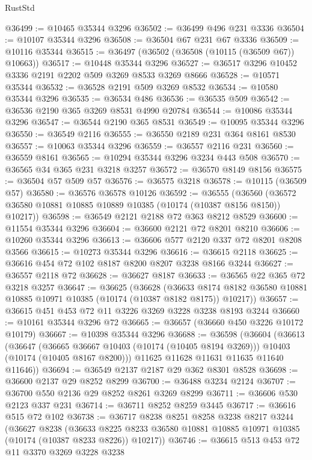 \begin{lexlean}{RustStd}
\begin{coremodule}
@36499 := @10465 @35344 @3296
@36502 := @36499 @496 @231 @3336
@36504 := @10107 @35344 @3296
@36508 := @36504 @67 @231 @67 @3336
@36509 := @10116 @35344
@36515 := @36497 (@36502 (@36508 (@10115 (@36509 @67)) @10663))
@36517 := @10448 @35344 @3296
@36527 := @36517 @3296 @10452 @3336 @2191 @2202 @509 @3269 @8533 @3269 @8666
@36528 := @10571 @35344
@36532 := @36528 @2191 @509 @3269 @8532
@36534 := @10580 @35344 @3296
@36535 := @36534 @486
@36536 := @36535 @509
@36542 := @36536 @2190 @365 @3269 @8531 @4990 @20784
@36544 := @10086 @35344 @3296
@36547 := @36544 @2190 @365 @8531
@36549 := @10095 @35344 @3296
@36550 := @36549 @2116
@36555 := @36550 @2189 @231 @364 @8161 @8530
@36557 := @10063 @35344 @3296
@36559 := @36557 @2116 @231
@36560 := @36559 @8161
@36565 := @10294 @35344 @3296 @3234 @443 @508
@36570 := @36565 @34 @365 @231 @3218 @3257
@36572 := @36570 @8149 @8156
@36575 := @36504 @57 @509 @57
@36576 := @36575 @3218
@36578 := @10115 (@36509 @57)
@36580 := @36576 @36578 @10126
@36592 := @36555
    (@36560 (@36572 @36580 @10881 @10885 @10889 @10385 (@10174 (@10387 @8156 @8150)) @10217))
@36598 := @36549 @2121 @2188 @72 @363 @8212 @8529
@36600 := @11554 @35344 @3296
@36604 := @36600 @2121 @72 @8201 @8210
@36606 := @10260 @35344 @3296
@36613 := @36606 @577 @2120 @337 @72 @8201 @8208 @3566
@36615 := @10273 @35344 @3296
@36616 := @36615 @2118
@36625 := @36616 @454 @72 @102 @8187 @8200 @8207 @3238 @8166 @3244
@36627 := @36557 @2118 @72
@36628 := @36627 @8187
@36633 := @36565 @22 @365 @72 @3218 @3257
@36647 := @36625
    (@36628
      (@36633 @8174 @8182 @36580 @10881 @10885 @10971 @10385 (@10174 (@10387 @8182 @8175)) @10217))
@36657 := @36615 @451 @453 @72 @11 @3226 @3269 @3228 @3238 @8193 @3244
@36660 := @10161 @35344 @3296 @72
@36665 := @36657 (@36660 @450 @3226 @10172 @10179)
@36667 := @10398 @35344 @3296
@36688 := @36598
    (@36604
      (@36613
        (@36647
          (@36665 @36667 @10403 (@10174 (@10405 @8194 @3269)))
          @10403
          (@10174 (@10405 @8167 @8200)))
        @11625
        @11628
        @11631
        @11635
        @11640
        @11646))
@36694 := @36549 @2137 @2187 @29 @362 @8301 @8528
@36698 := @36600 @2137 @29 @8252 @8299
@36700 := @36488 @3234 @2124
@36707 := @36700 @550 @2136 @29 @8252 @8261 @3269 @8299
@36711 := @36606 @530 @2123 @337 @231
@36714 := @36711 @8252 @8259 @3445
@36717 := @36616 @515 @72 @102
@36738 := @36717
    @8238
    @8251
    @8258
    @3238
    @8217
    @3244
    (@36627
      @8238
      (@36633 @8225 @8233 @36580 @10881 @10885 @10971 @10385 (@10174 (@10387 @8233 @8226)) @10217))
@36746 := @36615 @513 @453 @72 @11 @3370 @3269 @3228 @3238

\end{coremodule}
\end{lexlean}
